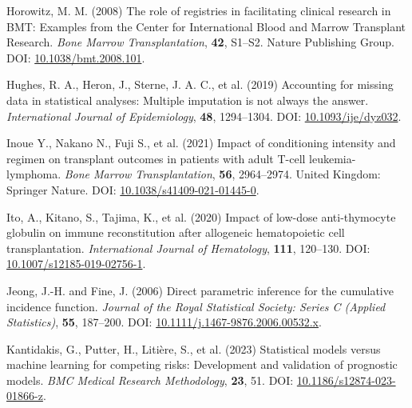 \documentclass[
  letterpaper,
  DIV=11,
  numbers=noendperiod]{scrreprt}
\newlength{\cslhangindent}
\newlength{\cslentryspacingunit} %
\newenvironment{CSLReferences}[2] %
 {%
  \setlength{\parindent}{0pt}
  \ifodd #1
  \let\oldpar\par
  \def\par{\hangindent=\cslhangindent\oldpar}
  \fi
  \setlength{\parskip}{#2\cslentryspacingunit}
 }%
 {}
\begin{document}
\begin{CSLReferences}{1}{0}
\leavevmode{}%
Horowitz, M. M. (2008) The role of registries in facilitating clinical
research in {BMT}: Examples from the {Center} for {International Blood}
and {Marrow Transplant Research}. \emph{Bone Marrow Transplantation},
\textbf{42}, S1--S2. Nature Publishing Group. DOI:
\href{https://doi.org/10.1038/bmt.2008.101}{10.1038/bmt.2008.101}.

\leavevmode{}%
Hughes, R. A., Heron, J., Sterne, J. A. C., et al. (2019) Accounting for
missing data in statistical analyses: Multiple imputation is not always
the answer. \emph{International Journal of Epidemiology}, \textbf{48},
1294--1304. DOI:
\href{https://doi.org/10.1093/ije/dyz032}{10.1093/ije/dyz032}.

\leavevmode{}%
Inoue Y., Nakano N., Fuji S., et al. (2021) Impact of conditioning
intensity and regimen on transplant outcomes in patients with adult
{T-cell} leukemia-lymphoma. \emph{Bone Marrow Transplantation},
\textbf{56}, 2964--2974. United Kingdom: Springer Nature. DOI:
\href{https://doi.org/10.1038/s41409-021-01445-0}{10.1038/s41409-021-01445-0}.

\leavevmode{}%
Ito, A., Kitano, S., Tajima, K., et al. (2020) Impact of low-dose
anti-thymocyte globulin on immune reconstitution after allogeneic
hematopoietic cell transplantation. \emph{International Journal of
Hematology}, \textbf{111}, 120--130. DOI:
\href{https://doi.org/10.1007/s12185-019-02756-1}{10.1007/s12185-019-02756-1}.

\leavevmode{}%
Jeong, J.-H. and Fine, J. (2006) Direct parametric inference for the
cumulative incidence function. \emph{Journal of the Royal Statistical
Society: Series C (Applied Statistics)}, \textbf{55}, 187--200. DOI:
\href{https://doi.org/10.1111/j.1467-9876.2006.00532.x}{10.1111/j.1467-9876.2006.00532.x}.

\leavevmode{}%
Kantidakis, G., Putter, H., Litière, S., et al. (2023) Statistical
models versus machine learning for competing risks: Development and
validation of prognostic models. \emph{BMC Medical Research
Methodology}, \textbf{23}, 51. DOI:
\href{https://doi.org/10.1186/s12874-023-01866-z}{10.1186/s12874-023-01866-z}.


\end{CSLReferences}
\end{document}
